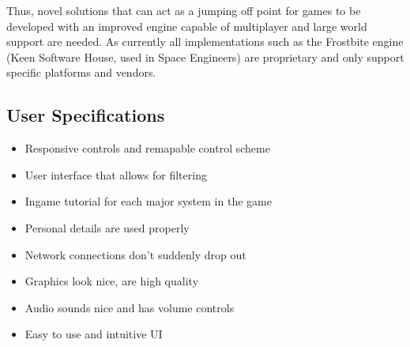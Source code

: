 \documentclass[12pt, DIV=calc]{scrartcl}
\begin{document}
\noindent Thus, novel solutions that can act as a jumping off point for games to be developed with an improved engine capable of multiplayer and large world support are needed. As currently all implementations such as the Frostbite engine (Keen Software House, used in Space Engineers) are proprietary and only support specific platforms and vendors.
\subsection{User Specifications}
\begin{itemize}
\item Responsive controls and remapable control scheme
\item User interface that allows for filtering
\item Ingame tutorial for each major system in the game
\item Personal details are used properly
\item Network connections don't suddenly drop out
\item Graphics look nice, are high quality
\item Audio sounds nice and has volume controls
\item Easy to use and intuitive UI
\end{itemize}
\end{document}
